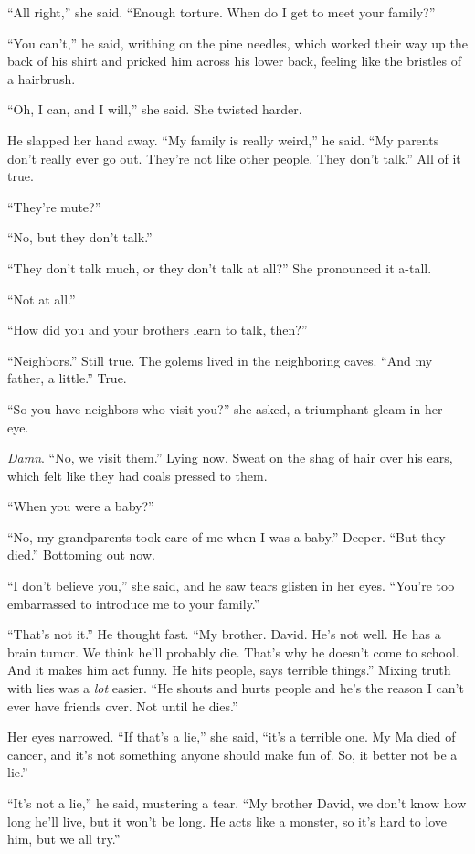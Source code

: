 ``All right,'' she said.  ``Enough torture.  When do I get to meet
your family?''

``You can't,'' he said, writhing on the pine needles, which worked
their way up the back of his shirt and pricked him across his lower
back, feeling like the bristles of a hairbrush.

``Oh, I can, and I will,'' she said.  She twisted harder.

He slapped her hand away.  ``My family is really weird,'' he said. 
``My parents don't really ever go out.  They're not like other people. 
They don't talk.'' All of it true.

``They're mute?''

``No, but they don't talk.''

``They don't talk much, or they don't talk at all?'' She pronounced it
a-tall.

``Not at all.''

``How did you and your brothers learn to talk, then?''

``Neighbors.'' Still true.  The golems lived in the neighboring caves. 
``And my father, a little.'' True.

``So you have neighbors who visit you?'' she asked, a triumphant gleam
in her eye.

\textit{Damn}.  ``No, we visit them.'' Lying now.  Sweat on the shag
of hair over his ears, which felt like they had coals pressed to them.

``When you were a baby?''

``No, my grandparents took care of me when I was a baby.'' Deeper. 
``But they died.'' Bottoming out now.

``I don't believe you,'' she said, and he saw tears glisten in her
eyes.  ``You're too embarrassed to introduce me to your family.''

``That's not it.'' He thought fast.  ``My brother.  David.  He's not
well.  He has a brain tumor.  We think he'll probably die.  That's why
he doesn't come to school.  And it makes him act funny.  He hits
people, says terrible things.'' Mixing truth with lies was a
\textit{lot} easier.  ``He shouts and hurts people and he's the reason
I can't ever have friends over.  Not until he dies.''

Her eyes narrowed.  ``If that's a lie,'' she said, ``it's a terrible
one.  My Ma died of cancer, and it's not something anyone should make
fun of.  So, it better not be a lie.''

``It's not a lie,'' he said, mustering a tear.  ``My brother David, we
don't know how long he'll live, but it won't be long.  He acts like a
monster, so it's hard to love him, but we all try.''

